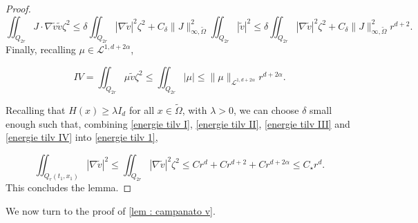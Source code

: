 \documentclass[reqno,12pt,twoside]{amsart}
\numberwithin{equation}{section} \numberwithin{theorem}{section}
\numberwithin{proposition}{section} \numberwithin{lemma}{section}
\numberwithin{corollary}{section}
\numberwithin{definition}{section} \numberwithin{remark}{section}
\begin{document}
\begin{proof}
\begin{equation}\label{energie tilv IV}
\iint_{Q_{2r}} J\cdot \nabla \widetilde{v} \widetilde{v} \zeta^2 \leqslant \delta \iint_{Q_{2r}} |\nabla \widetilde{v}|^2 \zeta^2 + C_\delta \|J\|_{\infty,\widetilde{\Omega}}^2 \iint_{Q_{2r}} |\widetilde{v}|^2 \leqslant  \delta \iint_{Q_{2r}} |\nabla \widetilde{v}|^2 \zeta^2  + C_\delta \|J\|_{\infty,\widetilde{\Omega}}^2 r^{d+2}.
\end{equation}
Finally, recalling $\mu\in \mathcal{L}^{1,d+2\alpha}$, 

\begin{equation}\label{energie tilv III}
IV = \iint_{Q_{2r}} \mu \widetilde{v} \zeta^2 \leqslant \iint_{Q_{2r}} |\mu| \leqslant \|\mu\|_{\mathcal{L}^{1,d+2\alpha}} r^{d+2\alpha}.
\end{equation}

Recalling that $H(x) \geqslant \lambda I_d$ for all $x\in \widetilde{\Omega}$, with $\lambda >0$, we can choose $\delta$ small enough such that, combining \eqref{energie tilv I}, \eqref{energie tilv II}, \eqref{energie tilv III} and \eqref{energie tilv IV} into \eqref{energie tilv 1}, 

\[\iint_{Q_r(t_1,x_1)} |\nabla \widetilde{v}|^2 \leqslant \iint_{Q_{2r}} |\nabla \widetilde{v}|^2 \zeta^2 \leqslant Cr^{d} + Cr^{d+2} + Cr^{d+2\alpha} \leqslant C_\star r^d.\]
This concludes the lemma.
\end{proof}

We now turn to the proof of \autoref{lem : campanato v}. 
\end{document}
